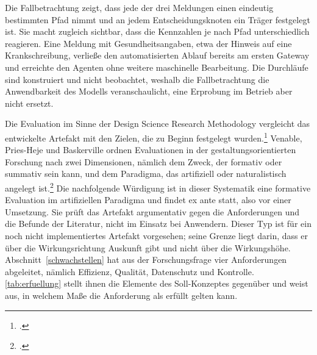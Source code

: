 Die Fallbetrachtung zeigt, dass jede der drei Meldungen einen eindeutig bestimmten Pfad nimmt und an jedem Entscheidungsknoten ein Tr\"ager festgelegt ist. Sie macht zugleich sichtbar, dass die Kennzahlen je nach Pfad unterschiedlich reagieren. Eine Meldung mit Gesundheitsangaben, etwa der Hinweis auf eine Krankschreibung, verlie{\ss}e den automatisierten Ablauf bereits am ersten Gateway und erreichte den Agenten ohne weitere maschinelle Bearbeitung. Die Durchl\"aufe sind konstruiert und nicht beobachtet, weshalb die Fallbetrachtung die Anwendbarkeit des Modells veranschaulicht, eine Erprobung im Betrieb aber nicht ersetzt.

Die Evaluation im Sinne der Design Science Research Methodology vergleicht das entwickelte Artefakt mit den Zielen, die zu Beginn festgelegt wurden.\footcite[Vgl.][S.~56]{Peffers2007} Venable, Pries-Heje und Baskerville ordnen Evaluationen in der gestaltungsorientierten Forschung nach zwei Dimensionen, n\"amlich dem Zweck, der formativ oder summativ sein kann, und dem Paradigma, das artifiziell oder naturalistisch angelegt ist.\footcite[Vgl.][hier S.~77]{Venable2016} Die nachfolgende W\"urdigung ist in dieser Systematik eine formative Evaluation im artifiziellen Paradigma und findet ex ante statt, also vor einer Umsetzung. Sie pr\"uft das Artefakt argumentativ gegen die Anforderungen und die Befunde der Literatur, nicht im Einsatz bei Anwendern. Dieser Typ ist f\"ur ein noch nicht implementiertes Artefakt vorgesehen; seine Grenze liegt darin, dass er \"uber die Wirkungsrichtung Auskunft gibt und nicht \"uber die Wirkungsh\"ohe. Abschnitt~\ref{schwachstellen} hat aus der Forschungsfrage vier Anforderungen abgeleitet, n\"amlich Effizienz, Qualit\"at, Datenschutz und Kontrolle. \autoref{tab:erfuellung} stellt ihnen die Elemente des Soll-Konzeptes gegen\"uber und weist aus, in welchem Ma{\ss}e die Anforderung als erf\"ullt gelten kann.


